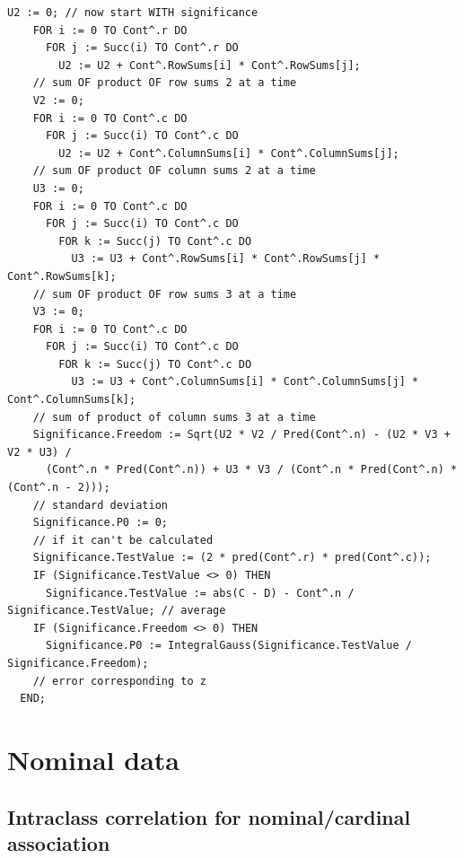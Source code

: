 \begin{refsection}
\begin{lstlisting}[caption= Correlation coefficients for ordinal/ordinal associations]
    U2 := 0; // now start WITH significance
    FOR i := 0 TO Cont^.r DO
      FOR j := Succ(i) TO Cont^.r DO
        U2 := U2 + Cont^.RowSums[i] * Cont^.RowSums[j];
    // sum OF product OF row sums 2 at a time
    V2 := 0;
    FOR i := 0 TO Cont^.c DO
      FOR j := Succ(i) TO Cont^.c DO
        U2 := U2 + Cont^.ColumnSums[i] * Cont^.ColumnSums[j];
    // sum OF product OF column sums 2 at a time
    U3 := 0;
    FOR i := 0 TO Cont^.c DO
      FOR j := Succ(i) TO Cont^.c DO
        FOR k := Succ(j) TO Cont^.c DO
          U3 := U3 + Cont^.RowSums[i] * Cont^.RowSums[j] * Cont^.RowSums[k];
    // sum OF product OF row sums 3 at a time
    V3 := 0;
    FOR i := 0 TO Cont^.c DO
      FOR j := Succ(i) TO Cont^.c DO
        FOR k := Succ(j) TO Cont^.c DO
          U3 := U3 + Cont^.ColumnSums[i] * Cont^.ColumnSums[j] * Cont^.ColumnSums[k];
    // sum of product of column sums 3 at a time
    Significance.Freedom := Sqrt(U2 * V2 / Pred(Cont^.n) - (U2 * V3 + V2 * U3) /
      (Cont^.n * Pred(Cont^.n)) + U3 * V3 / (Cont^.n * Pred(Cont^.n) * (Cont^.n - 2)));
    // standard deviation
    Significance.P0 := 0;
    // if it can't be calculated
    Significance.TestValue := (2 * pred(Cont^.r) * pred(Cont^.c));
    IF (Significance.TestValue <> 0) THEN
      Significance.TestValue := abs(C - D) - Cont^.n / Significance.TestValue; // average
    IF (Significance.Freedom <> 0) THEN
      Significance.P0 := IntegralGauss(Significance.TestValue / Significance.Freedom);
    // error corresponding to z
  END;
\end{lstlisting}

\section{Nominal data}

\subsection{Intraclass correlation for nominal/cardinal association}


\end{refsection}

